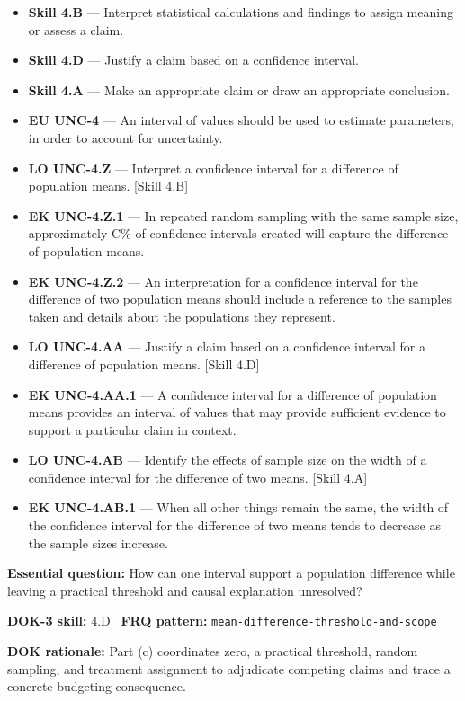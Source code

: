 \documentclass[11pt]{article}
\begin{document}


{\small
\begin{itemize}[leftmargin=1.5em,itemsep=2pt,topsep=2pt]
  \item \textbf{Skill 4.B} --- Interpret statistical calculations and findings to assign meaning or assess a claim.
  \item \textbf{Skill 4.D} --- Justify a claim based on a confidence interval.
  \item \textbf{Skill 4.A} --- Make an appropriate claim or draw an appropriate conclusion.
  \item \textbf{EU UNC-4} --- An interval of values should be used to estimate parameters, in order to account for uncertainty.
  \item \textbf{LO UNC-4.Z} --- Interpret a confidence interval for a difference of population means. [Skill 4.B]
  \item \textbf{EK UNC-4.Z.1} --- In repeated random sampling with the same sample size, approximately C\% of confidence intervals created will capture the difference of population means.
  \item \textbf{EK UNC-4.Z.2} --- An interpretation for a confidence interval for the difference of two population means should include a reference to the samples taken and details about the populations they represent.
  \item \textbf{LO UNC-4.AA} --- Justify a claim based on a confidence interval for a difference of population means. [Skill 4.D]
  \item \textbf{EK UNC-4.AA.1} --- A confidence interval for a difference of population means provides an interval of values that may provide sufficient evidence to support a particular claim in context.
  \item \textbf{LO UNC-4.AB} --- Identify the effects of sample size on the width of a confidence interval for the difference of two means. [Skill 4.A]
  \item \textbf{EK UNC-4.AB.1} --- When all other things remain the same, the width of the confidence interval for the difference of two means tends to decrease as the sample sizes increase.
\end{itemize}
}
\textbf{Essential question:} How can one interval support a population difference while leaving a practical threshold and causal explanation unresolved?\par
\textbf{DOK-3 skill:} 4.D \textperiodcentered\ \textbf{FRQ pattern:} {\small\texttt{mean-\allowbreak{}difference-\allowbreak{}threshold-\allowbreak{}and-\allowbreak{}scope}}\par
\textbf{DOK rationale:} Part (c) coordinates zero, a practical threshold, random sampling, and treatment assignment to adjudicate competing claims and trace a concrete budgeting consequence.\par
\end{document}
